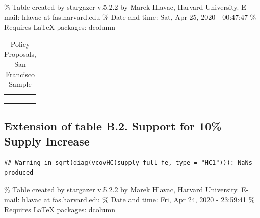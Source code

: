 \documentclass[]{article}
\begin{document}
\% Table created by stargazer v.5.2.2 by Marek Hlavac, Harvard University. E-mail: hlavac at fas.harvard.edu
\% Date and time: Sat, Apr 25, 2020 - 00:47:47
\% Requires LaTeX packages: dcolumn

\begin{table}[H] \centering 
  \caption{Policy Proposals, San Francisco Sample} 
  \label{sf_policies} 
\small 
\begin{tabular}{@{\extracolsep{5pt}} D{.}{.}{-2} } 
\\[-1.8ex]\hline 
\hline \\[-1.8ex] 
 \\ 
\hline \\[-1.8ex] 
\end{tabular} 
\end{table}

\hypertarget{extension-of-table-b.2.-support-for-10-supply-increase}{%
\subsection{Extension of table B.2. Support for 10\% Supply Increase}\label{extension-of-table-b.2.-support-for-10-supply-increase}}

\begin{verbatim}
## Warning in sqrt(diag(vcovHC(supply_full_fe, type = "HC1"))): NaNs produced
\end{verbatim}

\% Table created by stargazer v.5.2.2 by Marek Hlavac, Harvard University. E-mail: hlavac at fas.harvard.edu
\% Date and time: Fri, Apr 24, 2020 - 23:59:41
\% Requires LaTeX packages: dcolumn
\end{document}
